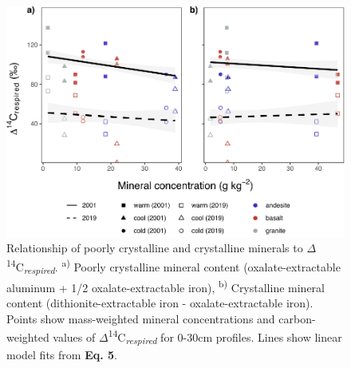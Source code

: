 \documentclass[english,man,floatsintext]{apa6}
\begin{document}
\begin{figure}

{\centering \includegraphics{sra-blk-inc-SI_files/figure-latex/min-inc30-plot-1} 

}

\caption{Relationship of poorly crystalline and crystalline minerals to \(\Delta\)\textsuperscript{14}C\textsubscript{\emph{respired}}. \textsuperscript{a)} Poorly crystalline mineral content (oxalate-extractable aluminum + 1/2 oxalate-extractable iron), \textsuperscript{b)} Crystalline mineral content (dithionite-extractable iron - oxalate-extractable iron). Points show mass-weighted mineral concentrations and carbon-weighted values of \(\Delta\)\textsuperscript{14}C\textsubscript{\emph{respired}} for 0-30cm profiles. Lines show linear model fits from \textbf{Eq. 5}.}\label{fig:min-inc30-plot}
\end{figure}


\clearpage
\renewcommand{\listfigurename}{Figure captions}

\clearpage
\renewcommand{\listtablename}{Table captions}
\end{document}
